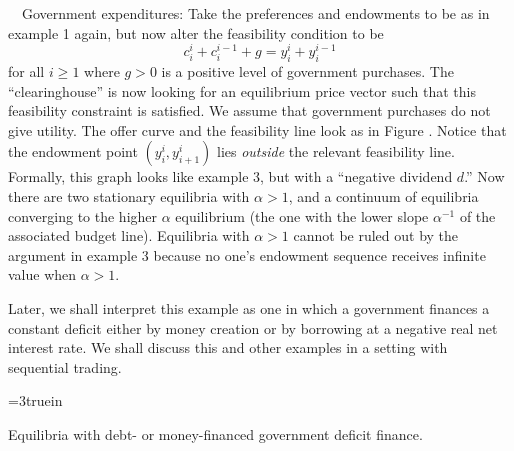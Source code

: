 \medskip
{} \ \ Government expenditures:
  Take the preferences and endowments
to be as in example 1 again, but now alter the feasibility
condition to be
$$ c^i_i  + c^{i-1}_i + g = y^i_i + y^{i-1}_i $$
for all $i \geq 1$ where $g > 0$ is a positive level of government
purchases. The ``clearinghouse'' is now looking for an equilibrium
price vector such that this feasibility constraint is satisfied.
We assume that government purchases do not
give utility.
 The offer curve and the feasibility line look
as   in Figure . %
 Notice that the endowment point $(y^i_i, y^i_{i+1})$
lies {\it outside} the relevant feasibility line.  Formally,
this graph looks like example 3, but with a ``negative dividend $d$.''
Now there are two stationary equilibria with $\alpha > 1$, and
a continuum of equilibria converging to the higher $\alpha$ equilibrium
(the one with the lower slope $\alpha^{-1}$ of the associated budget line).
Equilibria with $\alpha >1$ cannot be ruled out
by the argument in example 3 because no one's endowment sequence
receives infinite value when $\alpha >1$.


  Later, we shall interpret this example as one in which a government
finances a constant deficit either by money creation or by
borrowing at a negative real net interest rate.  We shall discuss this and
other examples in a setting with sequential trading.


\centerline{\epsfxsize=3truein}
\caption{Equilibria with debt- or money-financed government deficit finance.}
\endfigure

